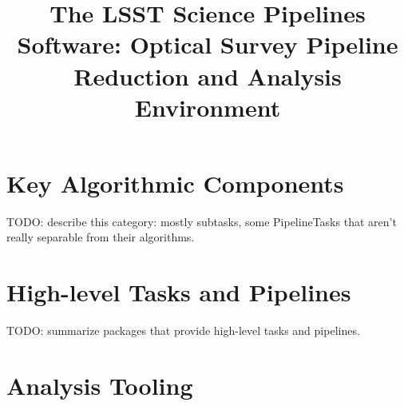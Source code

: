 \documentclass[twocolumn,longbib]{aastex7}
\begin{document}
\title{The LSST Science Pipelines Software: Optical Survey Pipeline Reduction and Analysis Environment}











\section{Key Algorithmic Components}
\label{sec:components}

TODO: describe this category: mostly subtasks, some PipelineTasks that aren't really separable from their algorithms.









\section{High-level Tasks and Pipelines}
\label{sec:tasks-and-pipelines}

TODO: summarize packages that provide high-level tasks and pipelines.










\section{Analysis Tooling}
\label{sec:analysis}





\end{document}
